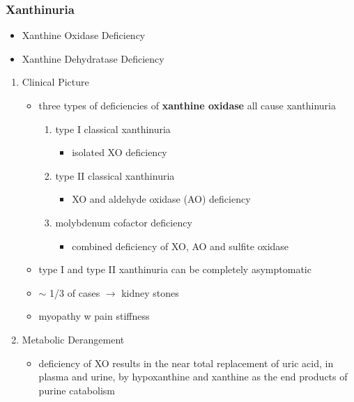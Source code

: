 \documentclass[12pt]{scrartcl}
\begin{document}
\subsubsection{Xanthinuria}
\label{sec:org35323d8}
\begin{itemize}
\item Xanthine Oxidase Deficiency
\item Xanthine Dehydratase Deficiency
\end{itemize}
\begin{enumerate}
\item Clinical Picture
\label{sec:orga59916c}
\begin{itemize}
\item three types of deficiencies of \textbf{xanthine oxidase} all cause
xanthinuria
\begin{enumerate}
\item type I classical xanthinuria
\begin{itemize}
\item isolated XO deficiency
\end{itemize}
\item type II classical xanthinuria
\begin{itemize}
\item XO and aldehyde oxidase (AO) deficiency
\end{itemize}
\item molybdenum cofactor deficiency
\begin{itemize}
\item combined deficiency of XO, AO and sulfite oxidase
\end{itemize}
\end{enumerate}
\item type I and type II xanthinuria can be completely asymptomatic
\item \(\sim\) 1/3 of cases \(\to\) kidney stones
\item myopathy w pain stiffness
\end{itemize}

\item Metabolic Derangement
\label{sec:orge510478}
\begin{itemize}
\item deficiency of XO results in the near total replacement of uric acid,
in plasma and urine, by hypoxanthine and xanthine as the end
products of purine catabolism
\end{itemize}



\end{enumerate}
\end{document}
